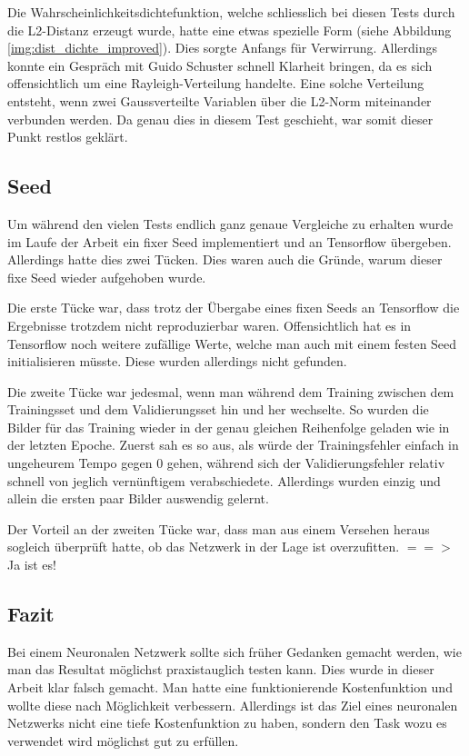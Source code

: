 Die Wahrscheinlichkeitsdichtefunktion, welche schliesslich bei diesen Tests durch die L2-Distanz erzeugt wurde, hatte eine etwas spezielle Form (siehe Abbildung \ref{img:dist_dichte_improved}).
Dies sorgte Anfangs für Verwirrung. 
Allerdings konnte ein Gespräch mit Guido Schuster \cite{PrivateCommunication} schnell Klarheit bringen, da es sich \grqq{}offensichtlich\grqq{} um eine Rayleigh-Verteilung handelte. 
Eine solche Verteilung entsteht, wenn zwei Gaussverteilte Variablen über die L2-Norm miteinander verbunden werden.
Da genau dies in diesem Test geschieht, war somit dieser Punkt restlos geklärt.

\subsection{Seed}
Um während den vielen Tests endlich ganz genaue Vergleiche zu erhalten wurde im Laufe der Arbeit ein fixer Seed implementiert und an Tensorflow übergeben.
Allerdings hatte dies zwei Tücken.
Dies waren auch die Gründe, warum dieser fixe Seed wieder aufgehoben wurde.

Die erste Tücke war, dass trotz der Übergabe eines fixen Seeds an Tensorflow die Ergebnisse trotzdem nicht reproduzierbar waren.
Offensichtlich hat es in Tensorflow noch weitere zufällige Werte, welche man auch mit einem festen Seed initialisieren müsste.
Diese wurden allerdings nicht gefunden.

Die zweite Tücke war jedesmal, wenn man während dem Training zwischen dem Trainingsset und dem Validierungsset hin und her wechselte.
So wurden die Bilder für das Training wieder in der genau gleichen Reihenfolge geladen wie in der letzten Epoche.
Zuerst sah es so aus, als würde der Trainingsfehler einfach in ungeheurem Tempo gegen 0 gehen, während sich der Validierungsfehler relativ schnell von jeglich vernünftigem verabschiedete.
Allerdings wurden einzig und allein die ersten paar Bilder auswendig gelernt.

Der Vorteil an der zweiten Tücke war, dass man aus einem Versehen heraus sogleich überprüft hatte, ob das Netzwerk in der Lage ist overzufitten. $==>$ Ja ist es!

\subsection{Fazit}
Bei einem Neuronalen Netzwerk sollte sich früher Gedanken gemacht werden, wie man das Resultat möglichst praxistauglich testen kann.
Dies wurde in dieser Arbeit klar falsch gemacht.
Man hatte eine funktionierende Kostenfunktion und wollte diese nach Möglichkeit verbessern.
Allerdings ist das Ziel eines neuronalen Netzwerks nicht eine tiefe Kostenfunktion zu haben, sondern den Task wozu es verwendet wird möglichst gut zu erfüllen.
